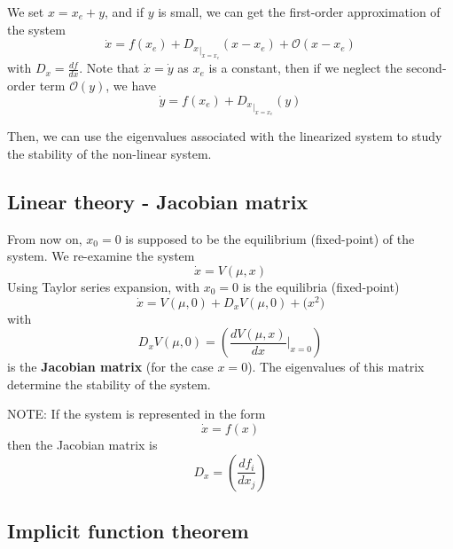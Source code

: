 We set $x=x_e+y$, and if $y$ is small, we can get the first-order
approximation of the system 
\begin{equation}
  \label{eq:649}
  \dot{x} = f(x_e) + {D_x}_{|_{x=x_e}} (x-x_e) + \mathcal{O}(x-x_e)
\end{equation}
with $D_x = \frac{df}{dx}$. Note that $\dot{x} = \dot{y}$ as $x_e$ is
a constant, then if we neglect the second-order term $\mathcal{O}(y)$,
we have
\begin{equation}
  \label{eq:656}
  \dot{y} = f(x_e) + {D_x}_{|_{x=x_e}} (y) 
\end{equation}

Then, we can use the eigenvalues associated with the linearized system
to study the stability of the non-linear system.



\subsection{Linear theory - Jacobian matrix}
\label{sec:line-theory-jacob}

From now on, $x_0=0$ is supposed to be the equilibrium (fixed-point)
of the system.  We re-examine the system
\begin{equation}
  \label{eq:638}
  \dot{x} = V(\mu,x)
\end{equation}
Using Taylor series expansion, with $x_0=0$ is the equilibria
(fixed-point)
\begin{equation}
  \label{eq:639}
  \dot{x} = V(\mu,0) + D_xV(\mu,0) + \mathcal(x^2)
\end{equation}
with 
\begin{equation}
  \label{eq:640}
  D_xV(\mu,0) = \left(\frac{dV(\mu,x)}{dx}|_{x=0} \right)
\end{equation}
is the {\bf Jacobian matrix} (for the case $x=0$). The eigenvalues of
this matrix determine the stability of the system.

NOTE: If the system is represented in the form
\begin{equation}
  \label{eq:641}
  \dot{x} = f(x)
\end{equation}
then the Jacobian matrix is
\begin{equation}
  \label{eq:642}
  D_x = \left( \frac{df_i}{dx_j}\right)
\end{equation}

\subsection{Implicit function theorem}
\label{sec:impl-funct-theor}

